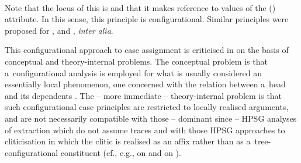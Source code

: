 \documentclass[output=paper
 	        ,biblatex
                ,babelshorthands
                ,newtxmath
                ,draftmode
                ,colorlinks, citecolor=brown
]{langscibook}
\begin{document}
\hfill
{}
\ex
{}
\impl\\
\hfill
{}
\z
Note that the locus of this  is  and that it makes reference to  values of the  () attribute.  In this sense, this principle is configurational.  Similar principles were proposed for  \citep{Yoo93a-u,brat:96},  \citep{Grover95a-u} and  \citep{prze:95b}, \emph{inter alia}.

This configurational approach to case assignment is criticised in \citet{prze:96,Prze99b,Prze99} on the basis of conceptual and theory-internal problems.  The conceptual problem is that a~configurational analysis is employed for what is usually considered an essentially local phenomenon, one concerned with the relation between a~head and its dependents \citep{blak:94}.  The – more immediate – theory-internal problem is that such configurational case principles are restricted to locally realised arguments, and are not necessarily compatible with those – dominant since \citet[Chapter~9]{ps2} – HPSG analyses of extraction which do not assume traces and with those HPSG approaches to cliticisation in which the clitic is realised as an affix rather than as a~tree-configurational constituent (cf., e.g., \citealt{MS97a-u} on  and \citealt{Monachesi99a-u} on ).
\end{document}
